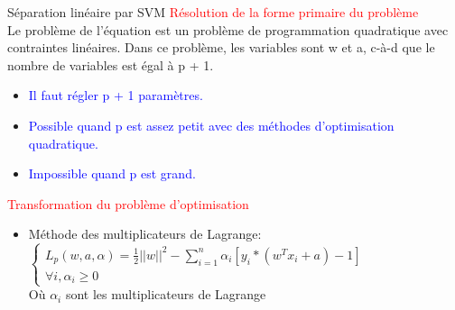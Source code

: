 \documentclass{bredelebeamer}
\begin{document}
 \begin{frame}{Séparation linéaire par SVM}
\textcolor{red}{Résolution de la forme primaire du problème}\vspace{1\baselineskip} \\
    
    Le problème de l’équation est un problème de programmation quadratique avec contraintes linéaires. Dans ce problème, les variables sont w et a, c-à-d que le nombre de variables est égal à p + 1. 
    
    \begin{itemize} 
        \item \textcolor{blue} {Il faut régler p + 1 paramètres.}
         \item \textcolor{blue}{ Possible quand p est assez petit avec des méthodes d'optimisation quadratique.}
         \item \textcolor{blue}{ Impossible quand p est grand.}
\end{itemize}
\textcolor{red}{Transformation du problème d’optimisation }
    \begin{itemize} 
        \item Méthode des multiplicateurs de Lagrange:
        $\left\{ \begin{array}{ll}
L_p(w,a,\alpha)=\frac{1}{2}||w||^2 - \sum\limits_{i=1}^{n}\alpha_i [y_i *(w^{T}x_i+a)-1] \\
\forall i,\alpha_i \geq 0
\end{array}\right.$ \vspace{1\baselineskip} \\
  Où $\alpha_i$   sont les multiplicateurs de Lagrange 

       \end{itemize} 
\end{frame}
\end{document}
